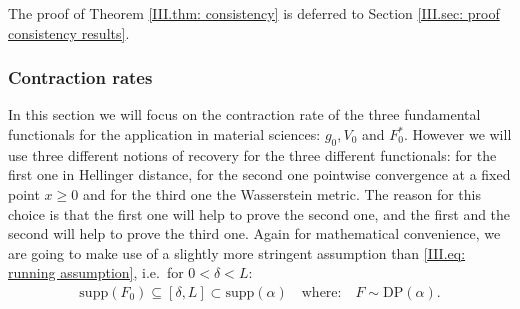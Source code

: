 The proof of Theorem \ref{III.thm: consistency} is deferred to Section \ref{III.sec: proof consistency results}.





\subsubsection{Contraction rates}\label{III.sec: contraction rates}

In this section we will focus on the contraction rate of the three fundamental functionals for the application in material sciences: $g_0, V_0 $ and $F^*_0$. However we will use three different notions of recovery for the three different functionals: for the first one in Hellinger distance, for the second one pointwise convergence at a fixed point $x \geq 0$ and for the third one the Wasserstein metric. The reason for this choice is that the first one will help to prove the second one, and the first and the second will help to prove the third one. Again for mathematical convenience, we are going to make use of a slightly more stringent assumption than \eqref{III.eq: running assumption}, i.e.\ for $0<\delta<L$:
\begin{align}\label{III.eq: running assumption2}
    \mathrm{supp}(F_0) \subseteq [\delta,L] \subset \mathrm{supp}(\alpha) \quad \text{where:} \quad F \sim \mathrm{DP}(\alpha).    
\end{align}

